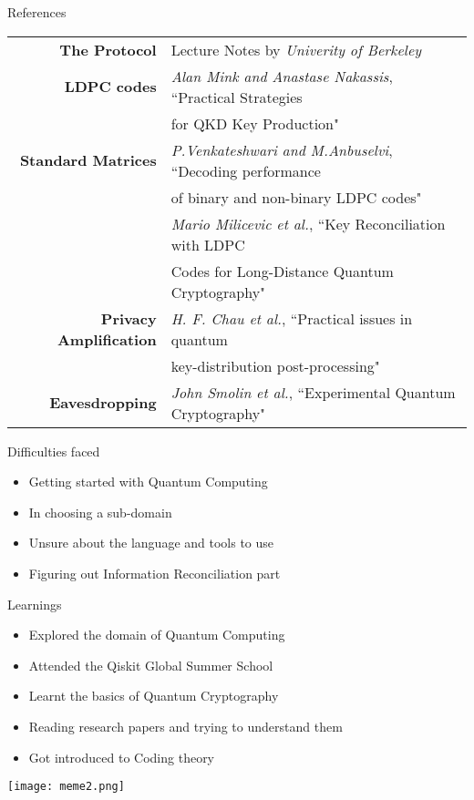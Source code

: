 \documentclass{beamer}
\begin{document}
\begin{frame}{References}
    \begin{tabular}{r l}
        \footnotesize{\textbf{The Protocol}} & \footnotesize{Lecture Notes by \emph{Univerity of Berkeley}} \\
            \footnotesize{\textbf{LDPC codes}} & \footnotesize{\emph{Alan Mink and Anastase Nakassis}}, \footnotesize{``Practical Strategies} \\
             & \footnotesize{for QKD Key Production"} \\
            \footnotesize{\textbf{Standard Matrices}} & \footnotesize{\emph{P.Venkateshwari and M.Anbuselvi}, ``Decoding performance} \\ 
             & \footnotesize{of binary and non-binary LDPC codes"} \\
             & \footnotesize{\emph{Mario Milicevic et al.}, ``Key Reconciliation with LDPC} \\ 
              & \footnotesize{Codes for Long-Distance Quantum Cryptography"} \\
            \footnotesize{\textbf{Privacy Amplification}} & \footnotesize{\emph{H. F. Chau et al.}, ``Practical issues in quantum} \\ 
              & \footnotesize{key-distribution post-processing"} \\
            \footnotesize{\textbf{Eavesdropping}} & \footnotesize{\emph{John Smolin et al.}, ``Experimental Quantum Cryptography"} \\
    \end{tabular}
\end{frame}
    

\begin{frame}{Difficulties faced}
	\begin{itemize}
		\item Getting started with Quantum Computing
        \item In choosing a sub-domain
        \item Unsure about the language and tools to use
		\item Figuring out Information Reconciliation part
	\end{itemize}
\end{frame}


\begin{frame}{Learnings}
	\begin{itemize}
		\item Explored the domain of Quantum Computing
        \item Attended the Qiskit Global Summer School
		\item Learnt the basics of Quantum Cryptography
		\item Reading research papers and trying to understand them
		\item Got introduced to Coding theory
	\end{itemize}
\end{frame}


\begin{frame}[Standout]
    \texttt{[image: meme2.png]}
\end{frame}
\end{document}
